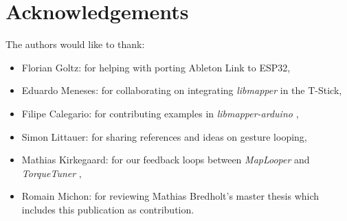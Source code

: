 \documentclass[sigconf]{nimeart}
\begin{document}
\section{Acknowledgements}\label{acknowledgements}

The authors would like to thank:

\begin{itemize}
\item
  Florian Goltz: for helping with porting Ableton Link to ESP32,
\item
  Eduardo Meneses: for collaborating on integrating \emph{libmapper} in the T-Stick,
\item
  Filipe Calegario: for contributing examples in \emph{libmapper-arduino} \cite{c25},
\item
  Simon Littauer: for sharing references and ideas on gesture looping,
\item
  Mathias Kirkegaard: for our feedback loops between \emph{MapLooper} and \emph{TorqueTuner} \cite{c41},
\item
  Romain Michon: for reviewing Mathias Bredholt's master thesis \cite{c42} which includes this publication as contribution.
\end{itemize}
\end{document}
